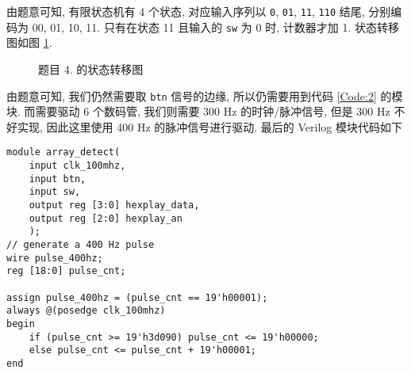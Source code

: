 \documentclass[UTF8,fontset=fandol]{ctexart}
\begin{document}
\begin{ExQuestions}
  \question 由题意可知, 有限状态机有 4 个状态, 对应输入序列以 \texttt{0}, \texttt{01}, \texttt{11}, \texttt{110} 结尾, 分别编码为 00, 01, 10, 11. 只有在状态 11 且输入的 \texttt{sw} 为 0 时, 计数器才加 1. 状态转移图如图 \ref{fig:state_transfer:2}.
  \begin{figure}[!htbp]
    \centering
    \caption{题目 4. 的状态转移图}
    \label{fig:state_transfer:2}
  \end{figure}
  由题意可知, 我们仍然需要取 \texttt{btn} 信号的边缘, 所以仍需要用到代码 \ref{Code:2} 的模块.
  而需要驱动 6 个数码管, 我们则需要 300 Hz 的时钟/脉冲信号, 但是 300 Hz 不好实现, 因此这里使用 400 Hz 的脉冲信号进行驱动.
  最后的 Verilog 模块代码如下
  \begin{lstlisting}[style = verilogstyle, caption = {题目 4. 的 Verilog 模块}, breaklines=true]  
module array_detect(
    input clk_100mhz,
    input btn,
    input sw,
    output reg [3:0] hexplay_data,
    output reg [2:0] hexplay_an
    );
// generate a 400 Hz pulse
wire pulse_400hz;
reg [18:0] pulse_cnt;

assign pulse_400hz = (pulse_cnt == 19'h00001);
always @(posedge clk_100mhz)
begin
    if (pulse_cnt >= 19'h3d090) pulse_cnt <= 19'h00000;
    else pulse_cnt <= pulse_cnt + 19'h00001;
end


\end{lstlisting}
\end{ExQuestions}
\end{document}
